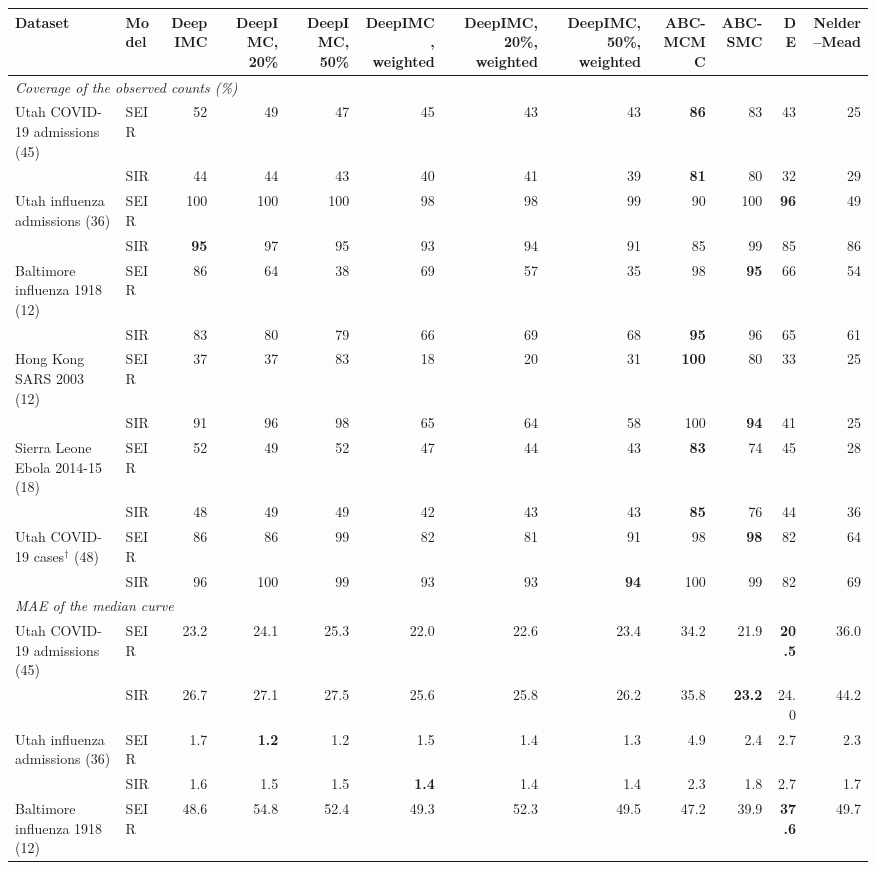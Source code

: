 \begin{tabular}{llrrrrrrrrrr}
\toprule
Dataset & Model & DeepIMC & DeepIMC, 20\% & DeepIMC, 50\% & DeepIMC, weighted & DeepIMC, 20\%, weighted & DeepIMC, 50\%, weighted & ABC-MCMC & ABC-SMC & DE & Nelder--Mead \\
\midrule
\multicolumn{12}{l}{\textit{Coverage of the observed counts (\%)}} \\
Utah COVID-19 admissions (45) & SEIR & 52 & 49 & 47 & 45 & 43 & 43 & \textbf{86} & 83 & 43 & 25 \\
 & SIR & 44 & 44 & 43 & 40 & 41 & 39 & \textbf{81} & 80 & 32 & 29 \\
Utah influenza admissions (36) & SEIR & 100 & 100 & 100 & 98 & 98 & 99 & 90 & 100 & \textbf{96} & 49 \\
 & SIR & \textbf{95} & 97 & 95 & 93 & 94 & 91 & 85 & 99 & 85 & 86 \\
Baltimore influenza 1918 (12) & SEIR & 86 & 64 & 38 & 69 & 57 & 35 & 98 & \textbf{95} & 66 & 54 \\
 & SIR & 83 & 80 & 79 & 66 & 69 & 68 & \textbf{95} & 96 & 65 & 61 \\
Hong Kong SARS 2003 (12) & SEIR & 37 & 37 & 83 & 18 & 20 & 31 & \textbf{100} & 80 & 33 & 25 \\
 & SIR & 91 & 96 & 98 & 65 & 64 & 58 & 100 & \textbf{94} & 41 & 25 \\
Sierra Leone Ebola 2014-15 (18) & SEIR & 52 & 49 & 52 & 47 & 44 & 43 & \textbf{83} & 74 & 45 & 28 \\
 & SIR & 48 & 49 & 49 & 42 & 43 & 43 & \textbf{85} & 76 & 44 & 36 \\
Utah COVID-19 cases$^\dagger$ (48) & SEIR & 86 & 86 & 99 & 82 & 81 & 91 & 98 & \textbf{98} & 82 & 64 \\
 & SIR & 96 & 100 & 99 & 93 & 93 & \textbf{94} & 100 & 99 & 82 & 69 \\
\midrule
\multicolumn{12}{l}{\textit{MAE of the median curve}} \\
Utah COVID-19 admissions (45) & SEIR & 23.2 & 24.1 & 25.3 & 22.0 & 22.6 & 23.4 & 34.2 & 21.9 & \textbf{20.5} & 36.0 \\
 & SIR & 26.7 & 27.1 & 27.5 & 25.6 & 25.8 & 26.2 & 35.8 & \textbf{23.2} & 24.0 & 44.2 \\
Utah influenza admissions (36) & SEIR & 1.7 & \textbf{1.2} & 1.2 & 1.5 & 1.4 & 1.3 & 4.9 & 2.4 & 2.7 & 2.3 \\
 & SIR & 1.6 & 1.5 & 1.5 & \textbf{1.4} & 1.4 & 1.4 & 2.3 & 1.8 & 2.7 & 1.7 \\
Baltimore influenza 1918 (12) & SEIR & 48.6 & 54.8 & 52.4 & 49.3 & 52.3 & 49.5 & 47.2 & 39.9 & \textbf{37.6} & 49.7 \\

\end{tabular}
